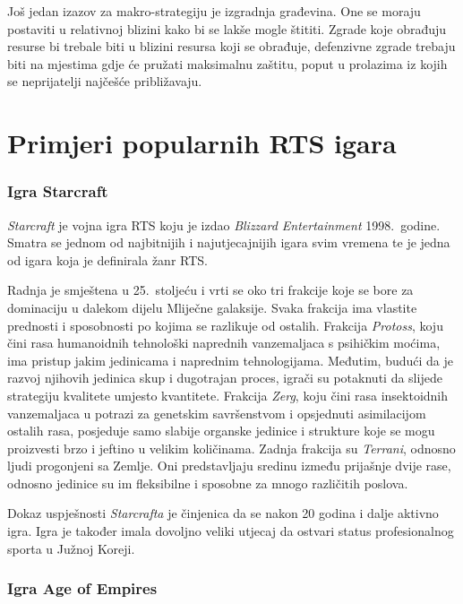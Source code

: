 \documentclass[times, utf8, zavrsni, numeric]{fer}
\begin{document}
\par Još jedan izazov za makro-strategiju je izgradnja građevina.
One se moraju postaviti u relativnoj blizini kako bi se lakše mogle štititi.
Zgrade koje obrađuju resurse bi trebale biti u blizini resursa koji se obrađuje, defenzivne zgrade trebaju biti na mjestima gdje će pružati maksimalnu zaštitu, poput u prolazima iz kojih se neprijatelji najčešće približavaju.

\section{Primjeri popularnih RTS igara}

\subsubsection{Igra Starcraft}

\par \textit{Starcraft} je vojna igra RTS koju je izdao \textit{Blizzard Entertainment} 1998.\ godine. 
Smatra se jednom od najbitnijih i najutjecajnijih igara svim vremena te je jedna od igara koja je definirala žanr RTS.

\par Radnja je smještena u 25.\ stoljeću i vrti se oko tri frakcije koje se bore za dominaciju u dalekom dijelu Mliječne galaksije. 
Svaka frakcija ima vlastite prednosti i sposobnosti po kojima se razlikuje od ostalih. 
Frakcija \textit{Protoss}, koju čini rasa humanoidnih tehnološki naprednih vanzemaljaca s psihičkim moćima, ima pristup jakim jedinicama i naprednim tehnologijama.
Međutim, budući da je razvoj njihovih jedinica skup i dugotrajan proces, igrači su potaknuti da slijede strategiju kvalitete umjesto kvantitete.
Frakcija \textit{Zerg}, koju čini rasa insektoidnih vanzemaljaca u potrazi za genetskim savršenstvom i opsjednuti asimilacijom ostalih rasa, posjeduje samo slabije organske jedinice i strukture koje se mogu proizvesti brzo i jeftino u velikim količinama.
Zadnja frakcija su \textit{Terrani}, odnosno ljudi progonjeni sa Zemlje.
Oni predstavljaju sredinu između prijašnje dvije rase, odnosno jedinice su im fleksibilne i sposobne za mnogo različitih poslova.

\par Dokaz uspješnosti \textit{Starcrafta} je činjenica da se nakon 20 godina i dalje aktivno igra.
Igra je također imala dovoljno veliki utjecaj da ostvari status profesionalnog sporta u Južnoj Koreji.

\subsubsection{Igra Age of Empires}
\end{document}
